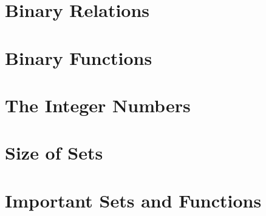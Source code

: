 \section{Binary Relations}\label{sec:math:binrel}



\section{Binary Functions}\label{sec:math:binop}



\section{The Integer Numbers}\label{sec:math:int}



\section{Size of Sets}\label{sec:math:setsize}



\section{Important Sets and Functions}\label{sec:math:sets}


